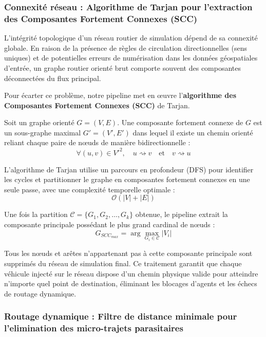 \documentclass[10pt, a4paper]{article}
\begin{document}
\subsubsection{Connexité réseau : Algorithme de Tarjan pour l'extraction
des Composantes Fortement Connexes
(SCC)}\label{connexituxe9-ruxe9seau-algorithme-de-tarjan-pour-lextraction-des-composantes-fortement-connexes-scc}

L'intégrité topologique d'un réseau routier de simulation dépend de sa
connexité globale. En raison de la présence de règles de circulation
directionnelles (sens uniques) et de potentielles erreurs de
numérisation dans les données géospatiales d'entrée, un graphe routier
orienté brut comporte souvent des composantes déconnectées du flux
principal.

Pour écarter ce problème, notre pipeline met en œuvre
l'\textbf{algorithme des Composantes Fortement Connexes (SCC)} de
Tarjan.

Soit un graphe orienté \(G = (V, E)\). Une composante fortement connexe
de \(G\) est un sous-graphe maximal \(G' = (V', E')\) dans lequel il
existe un chemin orienté reliant chaque paire de nœuds de manière
bidirectionnelle :
\[\forall (u, v) \in V'^2, \quad u \rightsquigarrow v \quad \text{et} \quad v \rightsquigarrow u\]

L'algorithme de Tarjan utilise un parcours en profondeur (DFS) pour
identifier les cycles et partitionner le graphe en composantes fortement
connexes en une seule passe, avec une complexité temporelle optimale :
\[\mathcal{O}(|V| + |E|)\]

Une fois la partition \(\mathcal{C} = \{G_1, G_2, \dots, G_k\}\)
obtenue, le pipeline extrait la composante principale possédant le plus
grand cardinal de nœuds :
\[G_{SCC_{max}} = \arg\max_{G_i \in \mathcal{C}} |V_i|\]

Tous les nœuds et arêtes n'appartenant pas à cette composante principale
sont supprimés du réseau de simulation final. Ce traitement garantit que
chaque véhicule injecté sur le réseau dispose d'un chemin physique
valide pour atteindre n'importe quel point de destination, éliminant les
blocages d'agents et les échecs de routage dynamique.

\subsubsection{Routage dynamique : Filtre de distance minimale pour
l'elimination des micro-trajets
parasitaires}\label{routage-dynamique-filtre-de-distance-minimale-pour-lelimination-des-micro-trajets-parasitaires}
\end{document}
